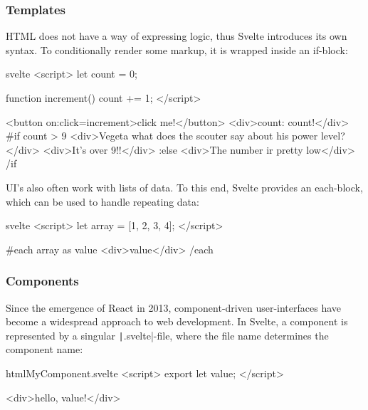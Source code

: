\subsubsection{Templates}


HTML does not have a way of expressing logic, thus Svelte introduces its own syntax. To conditionally render some markup, it is wrapped inside an if-block:

\begin{myminted}[highlightlines={11-14}]{svelte}{}
<script>
    let count = 0;

    function increment() {
        count += 1;
    }
</script>

<button on:click={increment}>click me!</button>
<div>count: {count}!</div>
{#if count > 9}
    <div>Vegeta what does the scouter say about his power level?</div>
    <div>It's over 9!!</div>
{:else}
    <div>The number ir pretty low</div>
{/if}
\end{myminted}

UI's also often work with lists of data. To this end, Svelte provides an each-block, which can be used to handle repeating data:

\begin{myminted}[highlightlines={5-7}]{svelte}{}
<script>
    let array = [1, 2, 3, 4];
</script>

{#each array as value}
    <div>{value}</div>
{/each}
\end{myminted}

\subsubsection{Components}


Since the emergence of React in 2013, component-driven user-interfaces have become a widespread approach to web development. In Svelte, a component is represented by a singular \texttt|.svelte|-file, where the file name determines the component name: 

\begin{myminted}{html}{MyComponent.svelte}
<script>
    export let value;
</script>

<div>hello, {value}!</div>
\end{myminted}


